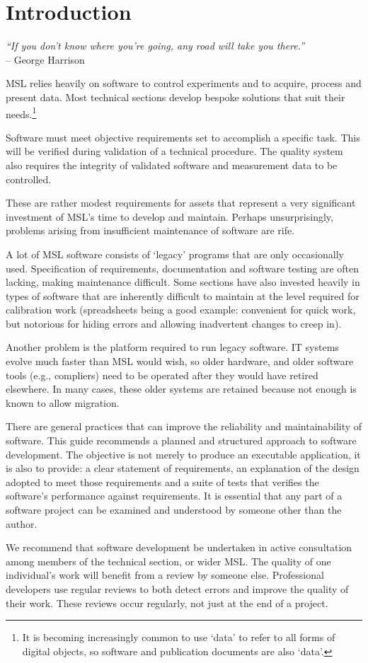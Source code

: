 \section{Introduction}
\begin{flushright}
\textit{“If you don’t know where you’re going, any road will take you there.”} \\
-- George Harrison 
\end{flushright}

MSL relies heavily on software to control experiments and to acquire, process and present data. Most technical sections develop bespoke solutions that suit their needs.\footnote{It is becoming increasingly common to use `data' to refer to all forms of digital objects, so software and publication documents are also `data'.} 

Software must meet objective requirements set to accomplish a specific task. This will be verified during validation of a technical procedure. The quality system also requires the integrity of validated software and measurement data to be controlled. 

These are rather modest requirements for assets that represent a very significant investment of MSL's time to develop and maintain.  Perhaps unsurprisingly, problems arising from insufficient maintenance of software are rife. 

A lot of MSL software consists of `legacy' programs that are only occasionally used. Specification of requirements, documentation and software testing are often lacking, making maintenance difficult. Some sections have also invested heavily in types of software that are inherently difficult to maintain at the level required for calibration work (spreadsheets being a good example: convenient for quick work, but notorious for hiding errors and allowing inadvertent changes to creep in). 

Another problem is the platform required to run legacy software. IT systems evolve much faster than MSL would wish, so older hardware, and older software tools (e.g., compliers) need to be operated after they would have retired elsewhere. In many cases, these older systems are retained because not enough is known to allow migration.

There are general practices that can improve the reliability and maintainability of software. This guide recommends a planned and structured approach to software development. The objective is not merely to produce an executable application, it is also to provide: a clear statement of  requirements, an explanation of the design adopted to meet those requirements and a suite of tests that verifies the software's performance against requirements. It is essential that any part of a software project can be examined and understood by someone other than the author.  

We recommend that software development be undertaken in active consultation among members of the technical section, or wider MSL. The quality of one individual's work will benefit from a review by someone else. Professional developers use regular reviews to both detect errors and improve the quality of their work. These reviews occur regularly, not just at the end of a project.   



